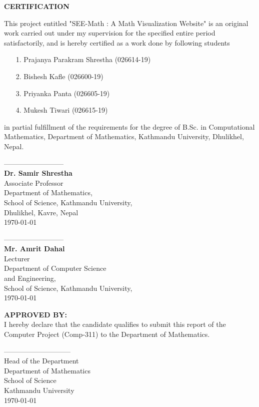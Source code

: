 



\begin{center}
	{\Large{\bf{ CERTIFICATION}}}
\end{center}


\noindent
This project entitled "SEE-Math : A Math Visualization Website" is an original work carried out  under my supervision for the specified entire period satisfactorily, and is hereby certified as a work done by following students
\begin{itemize}
\item[1.] Prajanya Parakram Shrestha (026614-19)
\item[2.] Bishesh Kafle (026600-19)
\item[3.] Priyanka Panta (026605-19)
\item[4.] Mukesh Tiwari (026615-19)
\end{itemize}
 in partial fulfillment of the requirements for the degree of B.Sc. in Computational Mathematics, Department of Mathematics, Kathmandu University, Dhulikhel, Nepal.

\vspace{2cm}


\begin{minipage}{0.6\linewidth}
	\noindent
	--------------------------\\          
	{\bf Dr. Samir Shrestha}\\
	Associate Professor \\
	Department of Mathematics,\\
	School of Science, Kathmandu University,\\
	Dhulikhel, Kavre, Nepal\\
	\today
\end{minipage}
\begin{minipage}{0.5\linewidth}
	\noindent
	--------------------------\\          
	{\bf Mr. Amrit Dahal}\\
	Lecturer \\
	Department of Computer Science\\ and Engineering,\\
	School of Science, Kathmandu University,\\
	\today
\end{minipage}


\vspace{1cm}

\noindent
{\bf APPROVED BY:}\\
I hereby declare that the candidate qualifies to submit this  report of the Computer Project (Comp-311) to the Department of Mathematics. 



\vspace{2cm}

\noindent
-----------------------------\\
Head of the Department\\
Department of Mathematics\\
School of Science\\
Kathmandu University\\
\today
  